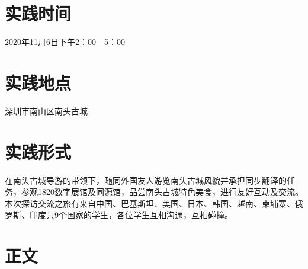 \documentclass[UTF8]{ctexart}
\begin{document}
\section*{\Large 实践时间}
2020年11月6日下午2：00---5：00
\section*{\Large 实践地点}
深圳市南山区南头古城
\section*{\Large 实践形式}
在南头古城导游的带领下，随同外国友人游览南头古城风貌并承担同步翻译的任务，参观1820数字展馆及同源馆，品尝南头古城特色美食，进行友好互动及交流。本次探访交流之旅有来自中国、巴基斯坦、美国、日本、韩国、越南、柬埔寨、俄罗斯、印度共9个国家的学生，各位学生互相沟通，互相碰撞。
\section*{\Large 正文}
\end{document}
